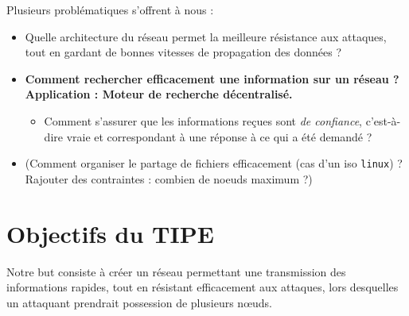 \documentclass[11pt,a4paper]{article}
\begin{document}
Plusieurs problématiques s'offrent à nous :
\begin{itemize}
	\item Quelle architecture du réseau permet la meilleure résistance aux attaques, tout en gardant de bonnes vitesses de propagation des données ?
	\item \textbf{Comment rechercher efficacement une information sur un réseau ? Application : Moteur de recherche décentralisé.}
	\begin{itemize}
		\item Comment s'assurer que les informations reçues sont \emph{de confiance}, c'est-à-dire vraie et correspondant à une réponse à ce qui a été demandé ?
	\end{itemize}
	
	\item (Comment organiser le partage de fichiers efficacement (cas d'un iso \texttt{linux}) ? Rajouter des contraintes : combien de noeuds maximum ?)
	
\end{itemize}

\section{Objectifs du TIPE}

Notre but consiste à créer un réseau permettant une transmission des informations rapides, tout en résistant efficacement aux attaques, lors desquelles un attaquant prendrait possession de plusieurs n{\oe}uds.



%	
%	  
%	



 
\end{document}
